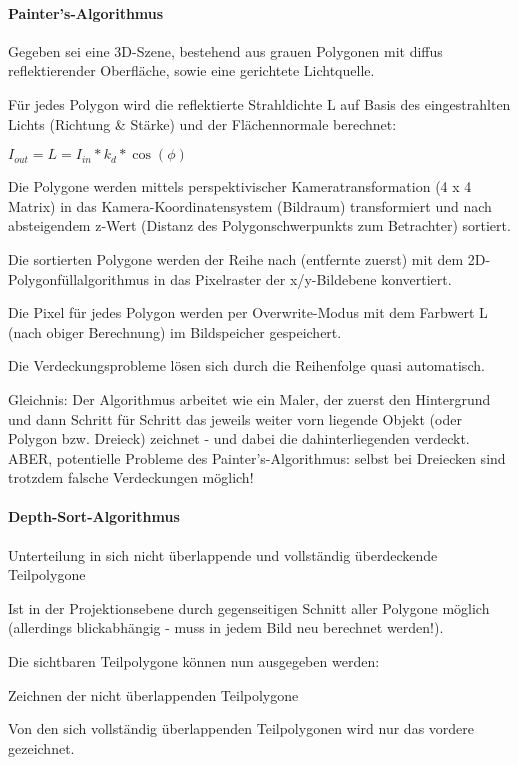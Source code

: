 \documentclass[landscape]{article}
\begin{document}
\begin{multicols}{3}
  \paragraph{Painter’s-Algorithmus}
  \begin{itemize*}
    \item Gegeben sei eine 3D-Szene, bestehend aus grauen Polygonen mit diffus reflektierender Oberfläche, sowie eine gerichtete Lichtquelle.
    \item Für jedes Polygon wird die reflektierte Strahldichte L auf Basis des eingestrahlten Lichts (Richtung \& Stärke) und der Flächennormale berechnet:
    \item $I_{out} = L = I_{in}* k_d * \cos(\phi)$
    \item Die Polygone werden mittels perspektivischer Kameratransformation (4 x 4 Matrix) in das Kamera-Koordinatensystem (Bildraum) transformiert und nach absteigendem z-Wert (Distanz des Polygonschwerpunkts zum Betrachter) sortiert.
    \item Die sortierten Polygone werden der Reihe nach (entfernte zuerst) mit dem 2D-Polygonfüllalgorithmus in das Pixelraster der x/y-Bildebene konvertiert.
    \item Die Pixel für jedes Polygon werden per Overwrite-Modus mit dem Farbwert L (nach obiger Berechnung) im Bildspeicher gespeichert.
    \item Die Verdeckungsprobleme lösen sich durch die Reihenfolge quasi automatisch.
  \end{itemize*}
  
  Gleichnis: Der Algorithmus arbeitet wie ein Maler, der zuerst den Hintergrund und dann Schritt für Schritt das jeweils weiter vorn liegende Objekt (oder Polygon bzw. Dreieck) zeichnet - und dabei die dahinterliegenden verdeckt. ABER, potentielle Probleme des Painter’s-Algorithmus: selbst bei Dreiecken sind trotzdem falsche Verdeckungen möglich!
  
  \paragraph{Depth-Sort-Algorithmus}
  \begin{itemize*}
    \item Unterteilung in sich nicht überlappende und vollständig überdeckende Teilpolygone
    \item Ist in der Projektionsebene durch gegenseitigen Schnitt aller Polygone möglich (allerdings blickabhängig - muss in jedem Bild neu berechnet werden!).
    \item Die sichtbaren Teilpolygone können nun ausgegeben werden:
    \item Zeichnen der nicht überlappenden Teilpolygone
    \item Von den sich vollständig überlappenden Teilpolygonen wird nur das vordere gezeichnet.
  \end{itemize*}
  

\end{multicols}
\end{document}
